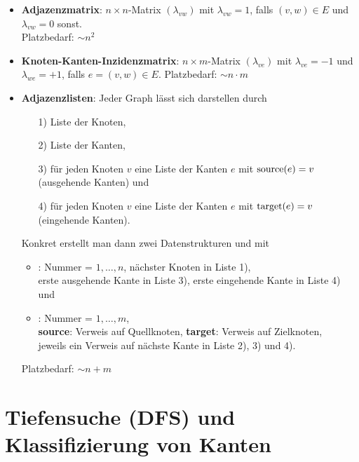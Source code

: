 \begin{itemize}
    \item \textbf{Adjazenzmatrix}:
    $n \times n$-Matrix $(\lambda_{vw})$ mit $\lambda_{vw} = 1$,
    falls $(v, w) \in E$ und $\lambda_{vw} = 0$ sonst. \\
    Platzbedarf: $\sim n^2$

    \item \textbf{Knoten-Kanten-Inzidenzmatrix}:
    $n \times m$-Matrix $(\lambda_{ve})$ mit $\lambda_{ve} = -1$ und
    $\lambda_{we} = +1$, falls $e = (v, w) \in E$.
    Platzbedarf: $\sim n \cdot m$

    \item \textbf{Adjazenzlisten}:
    Jeder Graph lässt sich darstellen durch
    \begin{enumerate}
        \item[1)] Liste der Knoten,

        \item[2)] Liste der Kanten,

        \item[3)] für jeden Knoten $v$ eine Liste der Kanten $e$ mit
        $\operatorname{source}(e) = v$ (ausgehende Kanten) und

        \item[4)] für jeden Knoten $v$ eine Liste der Kanten $e$ mit
        $\operatorname{target}(e) = v$ (eingehende Kanten).
    \end{enumerate}
    Konkret erstellt man dann zwei Datenstrukturen  und
     mit
    \begin{itemize}
        \item \textbf{}:
        Nummer = $1, \dotsc, n$, \quad
        nächster Knoten in Liste 1), \\
        erste ausgehende Kante in Liste 3), \quad
        erste eingehende Kante in Liste 4) und

        \item \textbf{}:
        Nummer = $1, \dotsc, m$, \\
        \textbf{source}: Verweis auf Quellknoten, \quad
        \textbf{target}: Verweis auf Zielknoten, \\
        jeweils ein Verweis auf nächste Kante in Liste 2), 3) und 4).
    \end{itemize}
    Platzbedarf: $\sim n + m$
\end{itemize}

\pagebreak

\section{%
    Tiefensuche (DFS) und Klassifizierung von Kanten%
}

